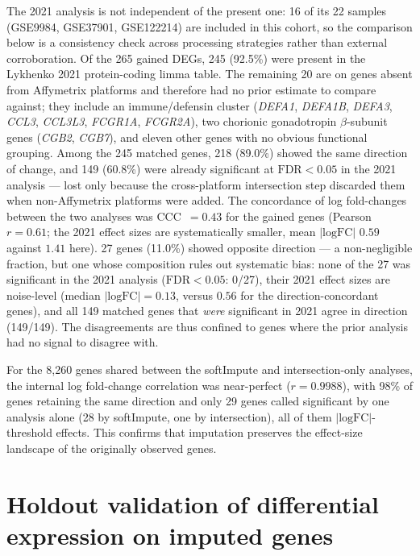 \documentclass[11pt,a4paper]{article}
\begin{document}
The 2021 analysis is not independent of the present one: 16 of
its 22 samples (GSE9984, GSE37901, GSE122214) are included in
this cohort, so the comparison below is a consistency check
across processing strategies rather than external
corroboration. Of the 265 gained DEGs, 245 (92.5\%) were
present in the Lykhenko 2021 protein-coding limma table. The remaining 20 are on genes
absent from Affymetrix platforms and therefore had no prior
estimate to compare against; they include an immune/defensin
cluster (\textit{DEFA1}, \textit{DEFA1B}, \textit{DEFA3},
\textit{CCL3}, \textit{CCL3L3}, \textit{FCGR1A},
\textit{FCGR2A}), two chorionic gonadotropin $\beta$-subunit
genes (\textit{CGB2}, \textit{CGB7}), and eleven other genes
with no obvious functional grouping. Among the 245 matched genes,
218 (89.0\%) showed the same direction of change, and 149
(60.8\%) were already significant at $\text{FDR} < 0.05$ in the
2021 analysis --- lost only because the cross-platform intersection
step discarded them when non-Affymetrix platforms were added. The
concordance of log fold-changes between the two analyses was
CCC~$= 0.43$ for the gained genes (Pearson $r = 0.61$; the 2021
effect sizes are systematically smaller, mean $|\text{logFC}|$
$0.59$ against $1.41$ here). 27 genes (11.0\%)
showed opposite direction --- a non-negligible fraction, but
one whose composition rules out systematic bias: none of the
27 was significant in the 2021 analysis
($\text{FDR} < 0.05$: 0/27), their 2021 effect sizes are
noise-level (median $|\text{logFC}| = 0.13$, versus $0.56$
for the direction-concordant genes), and all 149 matched genes
that \emph{were} significant in 2021 agree in direction
(149/149). The disagreements are thus confined to genes where
the prior analysis had no signal to disagree with.

For the 8{,}260 genes shared between the softImpute and
intersection-only analyses, the internal log fold-change
correlation was near-perfect ($r = 0.9988$), with 98\% of
genes retaining the same direction and only 29 genes called
significant by one analysis alone (28 by softImpute, one by
intersection), all of them $|\text{logFC}|$-threshold effects. This confirms that imputation preserves the
effect-size landscape of the originally observed
genes.

\section{Holdout validation of differential expression on imputed genes}
\label{sec:supp-blockholdout}
\end{document}
